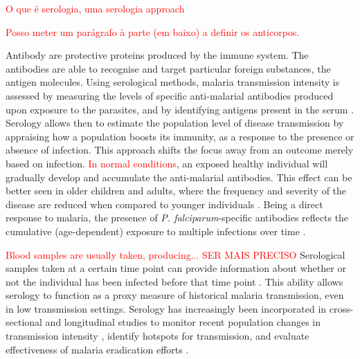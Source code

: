\textcolor{red}{O que é serologia, uma serologia approach

Posso meter um parágrafo à parte (em baixo) a definir os anticorpos.}
Antibody are protective proteins produced by the immune system.
The antibodies are able to recognise and target particular foreign substances, the antigen molecules.
Using serological methods, malaria transmission intensity is assessed by measuring the levels of specific anti-malarial antibodies produced upon exposure to the parasites, and by identifying antigens present in the serum \cite{corran2007serology, drakeley2005estimating}.
Serology allows then to estimate the population level of disease transmission by appraising how a population boosts its immunity, as a response to the presence or absence of infection.
This approach shifts the focus away from an outcome merely based on infection.
\textcolor{red}{In normal conditions}, an exposed healthy individual will gradually develop and accumulate the anti-malarial antibodies.
This effect can be better seen in older children and adults, where the frequency and severity of the disease are reduced when compared to younger individuals \cite{snow2002consequences}.
Being a direct response to malaria, the presence of \textit{P. falciparum}-specific antibodies reflects the cumulative (age-dependent) exposure to multiple infections over time \cite{van2015serology}.

\textcolor{red}{Blood samples are usually taken, producing... SER MAIS PRECISO} Serological samples taken at a certain time point can provide information about whether or not the individual has been infected before that time point \cite{hens2012modeling}.
This ability allows serology to function as a proxy measure of historical malaria transmission, even in low transmission settings.
Serology has increasingly been incorporated in cross-sectional and longitudinal studies to monitor recent population changes in transmission intensity \cite{cook2010using, cook2011serological, hay2008measuring}, identify hotspots for transmission, and evaluate effectiveness of malaria eradication efforts \cite{bruce1973seroepidemiological}.

